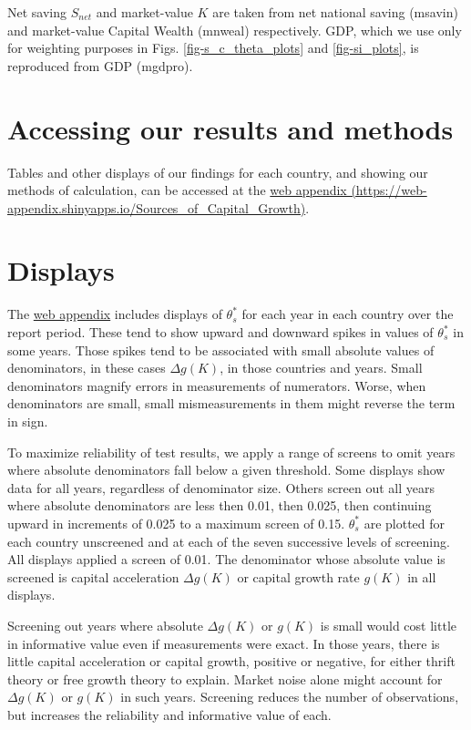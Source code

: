 \documentclass[a4paper,fleqn]{latex_styles/cas-sc}
\begin{document}
Net saving $S_{net}$ and market-value $K$ are taken from net national saving (msavin) and market-value Capital Wealth (mnweal) respectively. GDP, which we use only for weighting purposes in Figs. \ref{fig-s_c_theta_plots} and \ref{fig-si_plots}, is reproduced from GDP (mgdpro).

\hypertarget{accessing-our-results-and-methods}{%
\section{Accessing our results and
methods}\label{accessing-our-results-and-methods}}

Tables and other displays of our findings for each country, and showing
our methods of calculation, can be accessed at the
\href{https://web-appendix.shinyapps.io/Sources\_of\_Capital\_Growth/}{web appendix (https://web-appendix.shinyapps.io/Sources\_of\_Capital\_Growth)}.

\hypertarget{sec-displays}{%
\section{Displays}\label{sec-displays}}

The \href{https://web-appendix.shinyapps.io/Sources\_of\_Capital\_Growth/}{web
appendix} includes displays of \(\theta_s^*\) for
each year in each country over the report period. These tend to show
upward and downward spikes in values of \(\theta_s^*\)
in some years. Those spikes tend to be associated with small absolute
values of denominators, in these cases \(\Delta g(K)\), in those
countries and years. Small denominators magnify errors in measurements
of numerators. Worse, when denominators are small, small mismeasurements in them might reverse the term in sign.

To maximize reliability of test results, we apply a range of screens to
omit years where absolute denominators fall below a given
threshold. Some displays show data for all years, regardless of denominator size.
Others screen out all years where
absolute denominators are less then 0.01, then 0.025, then continuing upward in
increments of 0.025 to a maximum screen of 0.15. \(\theta_s^*\)
are plotted for each country unscreened and at each of the
seven successive levels of screening. All displays applied a screen of 0.01. 
The denominator whose absolute value is screened is capital acceleration
$\Delta g(K)$ or capital growth rate \(g(K)\) in all displays. 

Screening out years where absolute \(\Delta g(K)\) or $g(K)$ is small would cost
little in informative value even if measurements were exact. In those
years, there is little capital acceleration or capital growth, positive or negative, for
either thrift theory or free growth theory to explain. Market noise
alone might account for \(\Delta g(K)\) or $g(K)$ in such years. Screening reduces
the number of observations, but increases the reliability and
informative value of each.
\end{document}
